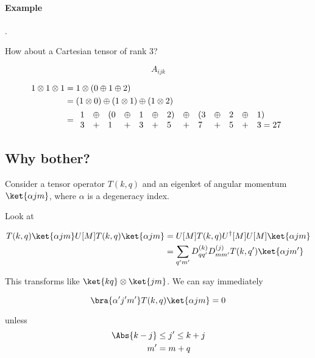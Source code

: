 \paragraph{Example}.

How about a Cartesian tensor of rank 3?

\begin{equation}\label{eqn:qmTwoL20:110}
A_{ijk}
\end{equation}

\begin{align*}\label{eqn:qmTwoL20:130}
1 \otimes 1 \otimes 1  
&=
1 \otimes ( 0 \oplus 1 \oplus 2) \\
&=
(1 \otimes 0) \oplus (1 \otimes 1) \oplus (1 \otimes 2) \\
&=
\begin{array}{l l l l l l l l l l l l l l}
1 &\oplus   &(0 &\oplus &1 &\oplus &2) &\oplus &(3  &\oplus & 2 &\oplus &1) \\
3 &+        &1 &+      &3 &+      &5  &+       &7  &+      & 5 &+      &3 = 27
\end{array}
\end{align*}

\subsection{Why bother?}

Consider a tensor operator $T(k, q)$ and an eigenket of angular momentum $\ket{\alpha j m}$, where $\alpha$ is a degeneracy index.

Look at

\begin{align*}
T(k, q) \ket{\alpha j m}
U[M] T(k, q) \ket{\alpha j m}
&=
U[M] T(k, q) U^\dagger[M] U[M] \ket{\alpha j m} \\
&=
\sum_{q' m'} 
D^{(k)}_{q q'} 
D^{(j)}_{m m'} 
T(k, q') \ket{\alpha j m'} 
\end{align*}

This transforms like $\ket{k q} \otimes \ket{j m}$.  We can say immediately

\begin{equation}\label{eqn:qmTwoL20:150}
\bra{\alpha' j' m'} T(k, q) \ket{\alpha j m} = 0 
\end{equation}

unless 
\begin{align}\label{eqn:qmTwoL20:170}
\Abs{k - j} &\le j' \le k + j \\
m' &= m + q
\end{align}

